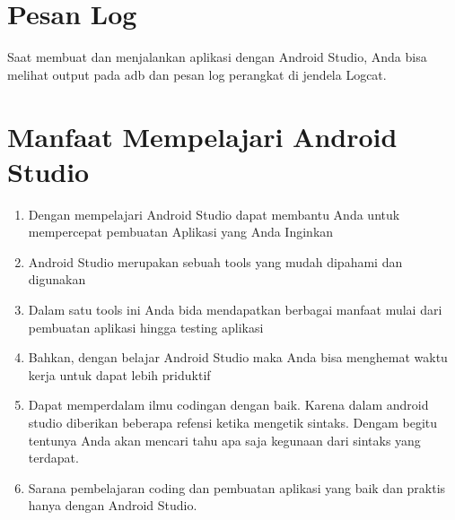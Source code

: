 \begin{enumerate}
\section{Pesan Log}
\hfill \break
Saat membuat dan menjalankan aplikasi dengan Android Studio, Anda bisa melihat output pada adb dan pesan log perangkat di jendela Logcat.
\section{Manfaat Mempelajari Android Studio}
\begin{enumerate}
\item Dengan mempelajari Android Studio dapat membantu Anda untuk mempercepat pembuatan Aplikasi yang Anda Inginkan
\item Android Studio merupakan sebuah tools yang mudah dipahami dan digunakan
\item Dalam satu tools ini Anda bida mendapatkan berbagai manfaat mulai dari pembuatan aplikasi hingga testing aplikasi
\item Bahkan, dengan belajar Android Studio maka Anda bisa menghemat waktu kerja untuk dapat lebih priduktif
\item Dapat memperdalam ilmu codingan dengan baik. Karena dalam android studio diberikan beberapa refensi ketika mengetik sintaks. Dengam begitu tentunya Anda akan mencari tahu apa saja kegunaan dari sintaks yang terdapat.
\item Sarana pembelajaran coding dan pembuatan aplikasi yang baik dan praktis hanya dengan Android Studio.
\end{enumerate}
\end{enumerate}

